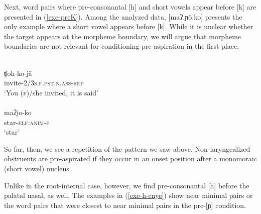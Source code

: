 \documentclass[output=paper]{langscibook}
\begin{document}
Next, word pairs where pre-consonantal [h] and short vowels appear before [k] are presented in (\ref{exe-preK}). Among the analyzed data, [maʔ.ɲõ.ko] presents the only example where a short vowel appears before [k]. While it is unclear whether the target appears at the morpheme boundary, we will argue that morpheme boundaries are not relevant for conditioning pre-aspiration in the first place.

\begin{exe}
\ex\label{exe-preK}
\begin{xlist}
\ex
\glll [ʧoh.ko.ɲã]\\
ʧoh-ko-jã\\
invite-\textsc{2/3s.f.pst.n.ass-rep}\\
\trans `You (\textsc{f})/she invited, it is said'\\
{\citep[20110328slicr001.028]{Bruil:2012}}
\ex
\glll [mãʔ.ɲõ.ko]\\
maʔjo-ko\\
star-\textsc{elf:anim-f}\\
\trans `star'\\
{\citep[20120919elicr005]{Bruil:2012}}
\end{xlist}
\end{exe}  


So far, then, we see a repetition of the pattern we saw above. Non-la\-ryn\-ge\-a\-lized obstruents are pre-aspirated if they occur in an onset position after a monomoraic (short vowel) nucleus.

Unlike in the root-internal case, however, we find pre-consonantal [h] before the palatal nasal, as well. The examples in (\ref{exe-h-enye}) show near minimal pairs or the word pairs that were closest to near minimal pairs in the pre-[ɲ] condition.
\end{document}
